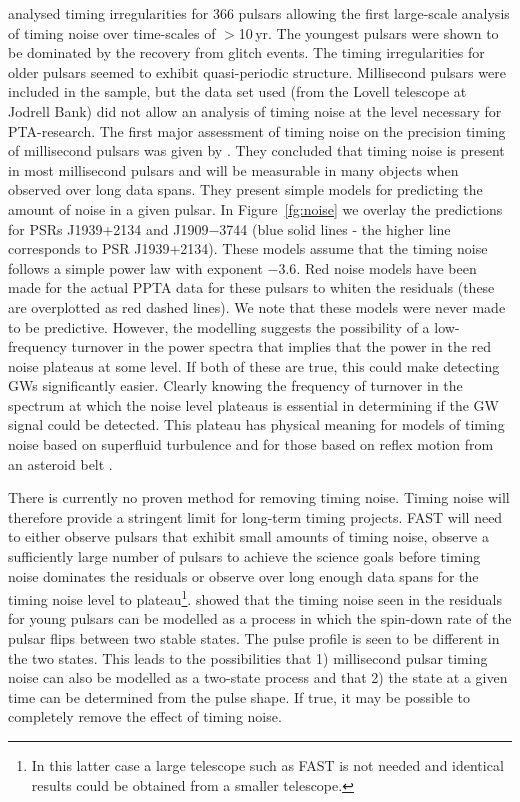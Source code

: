 \documentclass{raa}            %
\begin{document}
\cite{hlk10} analysed timing irregularities for 366 pulsars allowing the first large-scale analysis of timing noise over time-scales of $>$10\,yr. The youngest pulsars were shown to be dominated by the recovery from glitch events. The timing irregularities for older pulsars seemed to exhibit quasi-periodic structure.  Millisecond pulsars were included in the sample, but the data set used (from the Lovell telescope at Jodrell Bank) did not allow an analysis of timing noise at the level necessary for PTA-research.  The first major assessment of timing noise on the precision timing of millisecond pulsars was given by \cite{sc10}.  They concluded that timing noise is present in most millisecond pulsars and will be measurable in many objects when observed over long data spans. They present simple models for predicting the amount of noise in a given pulsar.  In Figure~\ref{fg:noise} we overlay the \cite{sc10} predictions for PSRs J1939+2134 and J1909$-$3744 (blue solid lines - the higher line corresponds to PSR J1939+2134).  These models assume that the timing noise follows a simple power law with exponent $-3.6$.  Red noise models have been made for the actual PPTA data for these pulsars to whiten the residuals (these are overplotted as red dashed lines).  We note that these models were never made to be predictive.  However, the modelling suggests the possibility of a low-frequency turnover in the power spectra that implies that the power in the red noise plateaus at some level.  If both of these are true, this could make detecting GWs significantly easier.   Clearly knowing the frequency of turnover in the spectrum at which the noise level plateaus is essential in determining if the GW signal could be detected.  This plateau has physical meaning for models of timing noise based on superfluid turbulence \citep{ml14} and for those based on reflex motion from an asteroid belt \citep{scm+13}. 

There is currently no proven method for removing timing noise.  Timing noise will therefore provide a stringent limit for long-term timing projects.  FAST will need to either observe pulsars that exhibit small amounts of timing noise, observe a sufficiently large number of pulsars to achieve the science goals before timing noise dominates the residuals or observe over long enough data spans for the timing noise level to plateau\footnote{In this latter case a large telescope such as FAST is not needed and identical results could be obtained from a smaller telescope.}.  \cite{lhk+10} showed that the timing noise seen in the residuals for young pulsars can be modelled as a process in which the spin-down rate of the pulsar flips between two stable states. The pulse profile is seen to be different in the two states.  This leads to the possibilities that 1) millisecond pulsar timing noise can also be modelled as a two-state process and that 2) the state at a given time can be determined from the pulse shape.  If true, it may be possible to completely remove the effect of timing noise.
\end{document}
